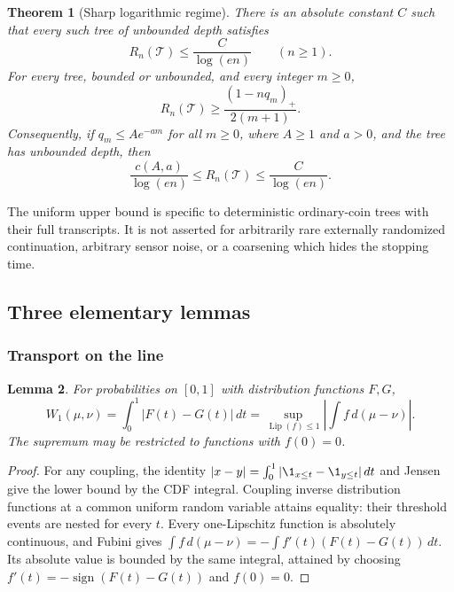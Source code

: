 \documentclass[11pt,a4paper]{article}
\newtheorem{theorem}{Theorem}[section]
\newtheorem{lemma}[theorem]{Lemma}
\theoremstyle{definition}\newtheorem{definition}[theorem]{Definition}
\theoremstyle{remark}\newtheorem{remark}[theorem]{Remark}
\DeclareMathOperator{\Lip}{Lip}\DeclareMathOperator{\Var}{Var}
\numberwithin{equation}{section}
\begin{document}
\begin{theorem}[Sharp logarithmic regime]\label{M02-th:main}
There is an absolute constant $C$ such that every such tree of unbounded depth satisfies
\[
 R_n(\mathcal T)\le\frac{C}{\log(en)}\qquad(n\ge1).
\]
For every tree, bounded or unbounded, and every integer $m\ge0$,
\[
 R_n(\mathcal T)\ge\frac{(1-nq_m)_+}{2(m+1)}.\tag{M02.1}
\]
Consequently, if $q_m\le A e^{-am}$ for all $m\ge0$, where $A\ge1$ and $a>0$, and the tree has unbounded depth, then
\[
 \frac{c(A,a)}{\log(en)}\le R_n(\mathcal T)
 \le\frac{C}{\log(en)}.
\]
\end{theorem}
The uniform upper bound is specific to deterministic ordinary-coin trees with their full transcripts. It is not asserted for arbitrarily rare externally randomized continuation, arbitrary sensor noise, or a coarsening which hides the stopping time.

\subsection{Three elementary lemmas}\label{M02-sec-2}
\subsubsection{Transport on the line}
\begin{lemma}\label{M02-lem:w}
For probabilities on $[0,1]$ with distribution functions $F,G$,
\[
 W_1(\mu,\nu)=\int_0^1|F(t)-G(t)|\,dt
 =\sup_{\Lip(f)\le1}\left|\int f\,d(\mu-\nu)\right|.
\]
The supremum may be restricted to functions with $f(0)=0$.
\end{lemma}
\begin{proof}
For any coupling, the identity
$|x-y|=\int_0^1|\1_{x\le t}-\1_{y\le t}|\,dt$
and Jensen give the lower bound by the CDF integral. Coupling inverse distribution functions at a common uniform random variable attains equality: their threshold events are nested for every $t$. Every one-Lipschitz function is absolutely continuous, and Fubini gives
$\int f\,d(\mu-\nu)=-\int f'(t)(F(t)-G(t))\,dt$.
Its absolute value is bounded by the same integral, attained by choosing $f'(t)=-\operatorname{sign}(F(t)-G(t))$ and $f(0)=0$.
\end{proof}
\end{document}

